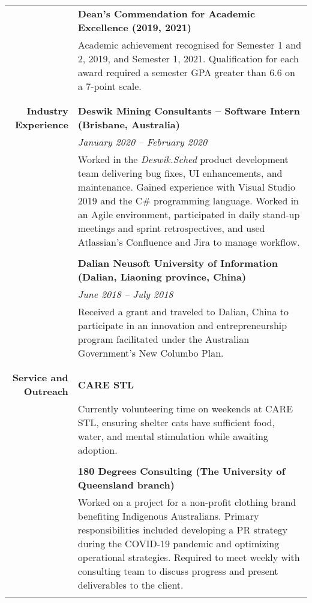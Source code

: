 \documentclass{article}
\begin{document}
\begin{longtable}{>{\columncolor{LeftColumn}}r | p{13cm}}
											& \large\textbf{Dean's Commendation for Academic Excellence (2019, 2021)} \\
											& Academic achievement recognised for Semester 1 and 2, 2019, and Semester 1, 2021. Qualification for each award required a semester GPA greater than 6.6 on a 7-point scale. \\
											& \\
											\hline \\

		\large\textbf{Industry Experience} 	& \large\textbf{Deswik Mining Consultants – Software Intern (Brisbane, Australia)} \\
											& \textit{January 2020 – February 2020} \\
											& Worked in the \textit{Deswik.Sched} product development team delivering bug fixes, UI enhancements, and maintenance. Gained experience with Visual Studio 2019 and the C\# programming language. Worked in an Agile environment, participated in daily stand-up meetings and sprint retrospectives, and used Atlassian’s Confluence and Jira to manage workflow. \\ 
											& \\

											& \large\textbf{Dalian Neusoft University of Information (Dalian, Liaoning province, China)} \\
											& \textit{June 2018 – July 2018} \\
											& Received a grant and traveled to Dalian, China to participate in an innovation and entrepreneurship program facilitated under the Australian Government’s New Columbo Plan. \\
											& \\
											\hline \\

		\large\textbf{Service and Outreach} & \large\textbf{CARE STL} \\
											& Currently volunteering time on weekends at CARE STL, ensuring shelter cats have sufficient food, water, and mental stimulation while awaiting adoption. \\	
											& \\

											& \large\textbf{180 Degrees Consulting (The University of Queensland branch)} \\
											& Worked on a project for a non-profit clothing brand benefiting Indigenous Australians. Primary responsibilities included developing a PR strategy during the COVID-19 pandemic and optimizing operational strategies. Required to meet weekly with consulting team to discuss progress and present deliverables to the client. \\	
											& \\
											\hline
											

\end{longtable}
\end{document}

